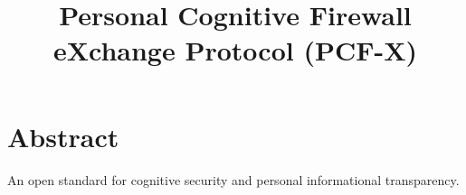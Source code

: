 \documentclass{article}
\begin{document}
\title{Personal Cognitive Firewall eXchange Protocol (PCF-X)}
\maketitle
\section*{Abstract}
An open standard for cognitive security and personal informational transparency.
\end{document}
